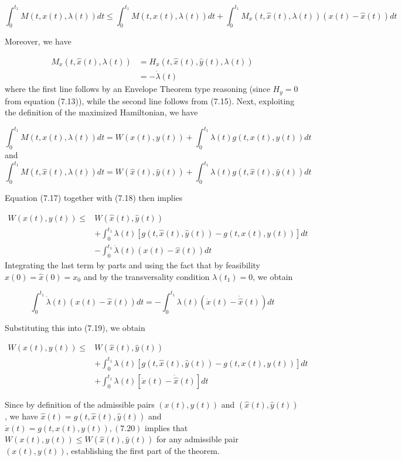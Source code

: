 \documentclass[\topdir/lecture_notes.tex]{subfiles}
\begin{document}
\[
\int_{0}^{t_{1}} M(t, x(t), \lambda(t)) d t \leq \int_{0}^{t_{1}} M(t, \hat{x}(t), \lambda(t)) d t+\int_{0}^{t_{1}} M_{x}(t, \hat{x}(t), \lambda(t))(x(t)-\hat{x}(t)) d t
\]

Moreover, we have

\[
\begin{aligned}
M_{x}(t, \hat{x}(t), \lambda(t)) & =H_{x}(t, \hat{x}(t), \hat{y}(t), \lambda(t)) \\
& =-\dot{\lambda}(t)
\end{aligned}
\]
where the first line follows by an Envelope Theorem type reasoning (since $H_{y}=0$ from equation (7.13)), while the second line follows from (7.15). Next, exploiting the definition of the maximized Hamiltonian, we have

\[
\int_{0}^{t_{1}} M(t, x(t), \lambda(t)) d t=W(x(t), y(t))+\int_{0}^{t_{1}} \lambda(t) g(t, x(t), y(t)) d t
\]
and
\[
\int_{0}^{t_{1}} M(t, \hat{x}(t), \lambda(t)) d t=W(\hat{x}(t), \hat{y}(t))+\int_{0}^{t_{1}} \lambda(t) g(t, \hat{x}(t), \hat{y}(t)) d t
\]

Equation (7.17) together with (7.18) then implies

\[
\begin{aligned}
W(x(t), y(t)) \leq & W(\hat{x}(t), \hat{y}(t)) \\
& +\int_{0}^{t_{1}} \lambda(t)[g(t, \hat{x}(t), \hat{y}(t))-g(t, x(t), y(t))] d t \\
& -\int_{0}^{t_{1}} \dot{\lambda}(t)(x(t)-\hat{x}(t)) d t
\end{aligned}
\]
Integrating the last term by parts and using the fact that by feasibility $x(0)=\hat{x}(0)=x_{0}$ and by the transversality condition $\lambda\left(t_{1}\right)=0$, we obtain

\[
\int_{0}^{t_{1}} \dot{\lambda}(t)(x(t)-\hat{x}(t)) d t=-\int_{0}^{t_{1}} \lambda(t)(\dot{x}(t)-\dot{\hat{x}}(t)) d t
\]

Substituting this into (7.19), we obtain

\[
\begin{aligned}
W(x(t), y(t)) \leq & W(\hat{x}(t), \hat{y}(t)) \\
& +\int_{0}^{t_{1}} \lambda(t)[g(t, \hat{x}(t), \hat{y}(t))-g(t, x(t), y(t))] d t \\
& +\int_{0}^{t_{1}} \lambda(t)[\dot{x}(t)-\dot{\hat{x}}(t)] d t
\end{aligned}
\]

Since by definition of the admissible pairs $(x(t), y(t))$ and $(\hat{x}(t), \hat{y}(t))$, we have $\hat{x}(t)=g(t, \hat{x}(t), \hat{y}(t))$ and $\dot{x}(t)=g(t, x(t), y(t)),(7.20)$ implies that $W(x(t), y(t)) \leq W(\hat{x}(t), \hat{y}(t))$ for any admissible pair $(x(t), y(t))$, establishing the first part of the theorem.
\end{document}
